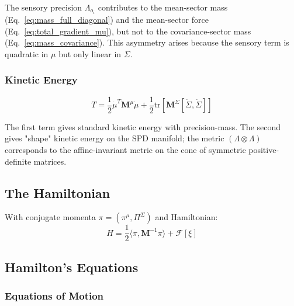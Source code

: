 \documentclass[12pt]{article}
\begin{document}
The sensory precision $\Lambda_{o_i}$ contributes to the mean-sector mass (Eq.~\ref{eq:mass_full_diagonal}) and the mean-sector force (Eq.~\ref{eq:total_gradient_mu}), but not to the covariance-sector mass (Eq.~\ref{eq:mass_covariance}). This asymmetry arises because the sensory term is quadratic in $\mu$ but only linear in $\Sigma$.

\subsubsection{Kinetic Energy}

\begin{equation}
T = \frac{1}{2}\dot{\mu}^T\mathbf{M}^\mu\dot{\mu} + \frac{1}{2}\mathrm{tr}\left[\mathbf{M}^\Sigma[\dot{\Sigma}, \dot{\Sigma}]\right]
\end{equation}

The first term gives standard kinetic energy with precision-mass. The second gives "shape" kinetic energy on the SPD manifold; the metric $(\Lambda \otimes \Lambda)$ corresponds to the affine-invariant metric on the cone of symmetric positive-definite matrices.

\subsection{The Hamiltonian}

With conjugate momenta $\pi = (\pi^\mu, \Pi^\Sigma)$ and Hamiltonian:
\begin{equation}
\boxed{
H = \frac{1}{2}\langle\pi, \mathbf{M}^{-1}\pi\rangle + \mathcal{F}[\xi]
}
\label{eq:hamiltonian}
\end{equation}

\subsection{Hamilton's Equations}

\subsubsection{Equations of Motion}
\end{document}
